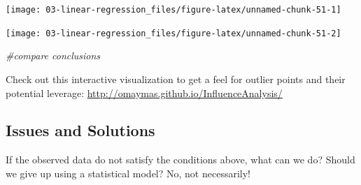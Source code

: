 \documentclass[
]{book}
\newenvironment{Shaded}{\begin{snugshade}}{\end{snugshade}}
\newcommand{\CommentTok}[1]{\textcolor[rgb]{0.56,0.35,0.01}{\textit{#1}}}
\newcommand{\DataTypeTok}[1]{\textcolor[rgb]{0.13,0.29,0.53}{#1}}
\newcommand{\DecValTok}[1]{\textcolor[rgb]{0.00,0.00,0.81}{#1}}
\newcommand{\KeywordTok}[1]{\textcolor[rgb]{0.13,0.29,0.53}{\textbf{#1}}}
\newcommand{\NormalTok}[1]{#1}
\newcommand{\OperatorTok}[1]{\textcolor[rgb]{0.81,0.36,0.00}{\textbf{#1}}}
\newcommand{\OtherTok}[1]{\textcolor[rgb]{0.56,0.35,0.01}{#1}}
\newcommand{\StringTok}[1]{\textcolor[rgb]{0.31,0.60,0.02}{#1}}
\begin{document}
\begin{center}\texttt{[image: 03-linear-regression\_files/figure-latex/unnamed-chunk-51-1]} \end{center}

\begin{Shaded}
\end{Shaded}

\begin{center}\texttt{[image: 03-linear-regression\_files/figure-latex/unnamed-chunk-51-2]} \end{center}

\begin{Shaded}
\begin{Highlighting}[]
\CommentTok{#compare conclusions}
\end{Highlighting}
\end{Shaded}

Check out this interactive visualization to get a feel for outlier points and their potential leverage: \url{http://omaymas.github.io/InfluenceAnalysis/}

\hypertarget{issues-and-solutions}{%
\subsection{Issues and Solutions}\label{issues-and-solutions}}

If the observed data do not satisfy the conditions above, what can we do? Should we give up using a statistical model? No, not necessarily!
\end{document}
